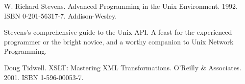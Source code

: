 \documentclass[12pt,oneside]{book}
\begin{document}
\begin{common-format}
\begin{thebibliography}{9}
%
%
%
%
%

 W. Richard Stevens. Advanced Programming in the Unix Environment. 1992. ISBN 0-201-56317-7. Addison-Wesley.

Stevens's comprehensive guide to the Unix API. A feast for the experienced programmer or the bright novice, and a worthy companion to Unix Network Programming.

%
%
 Doug Tidwell. XSLT: Mastering XML Transformations. O'Reilly \&{}  Associates. 2001. ISBN 1-596-00053-7.
%
%
%
%
%
%
%
%
%
%
\end{thebibliography}



\end{common-format}  
\end{document}
